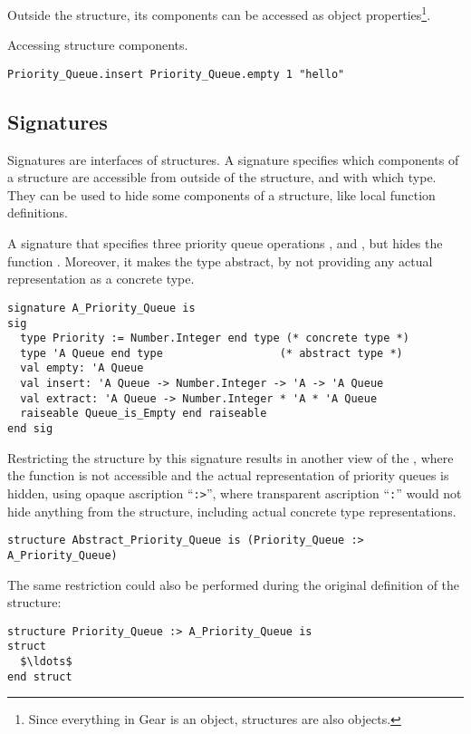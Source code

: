Outside the structure, its components can be accessed as object properties\footnote{Since everything in Gear is an object, structures are also objects.}. 

\example Accessing structure components.
\begin{lstlisting}
Priority_Queue.insert Priority_Queue.empty 1 "hello"
\end{lstlisting}






\subsection{Signatures}

Signatures are interfaces of structures. A signature specifies which components of a structure are accessible from outside of the structure, and with which type. They can be used to hide some components of a structure, like local function definitions. 

\example A signature that specifies three priority queue operations ,  and , but hides the function . Moreover, it makes the  type abstract, by not providing any actual representation as a concrete type. 
\begin{lstlisting}
signature A_Priority_Queue is
sig
  type Priority := Number.Integer end type (* concrete type *)
  type 'A Queue end type                  (* abstract type *)
  val empty: 'A Queue
  val insert: 'A Queue -> Number.Integer -> 'A -> 'A Queue
  val extract: 'A Queue -> Number.Integer * 'A * 'A Queue
  raiseable Queue_is_Empty end raiseable
end sig
\end{lstlisting}
Restricting the  structure by this signature results in another view of the , where the  function is not accessible and the actual representation of priority queues is hidden, using opaque ascription ``\lstinline!:>!'', where transparent ascription ``\lstinline!:!'' would not hide anything from the structure, including actual concrete type representations. 
\begin{lstlisting}
structure Abstract_Priority_Queue is (Priority_Queue :> A_Priority_Queue)
\end{lstlisting}
The same restriction could also be performed during the original definition of the structure:
\begin{lstlisting}
structure Priority_Queue :> A_Priority_Queue is
struct 
  $\ldots$
end struct
\end{lstlisting}





